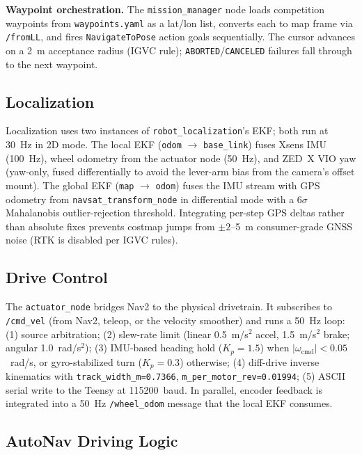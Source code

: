 \documentclass[12pt, letterpaper]{article}
\begin{document}
\textbf{Waypoint orchestration.} The \texttt{mission\_manager} node loads competition
waypoints from \texttt{waypoints.yaml} as a lat/lon list, converts each to map frame via
\texttt{/fromLL}, and fires \texttt{NavigateToPose} action goals sequentially. The
cursor advances on a 2~m acceptance radius (IGVC rule); \texttt{ABORTED}/\texttt{CANCELED}
failures fall through to the next waypoint.

\subsection{Localization}

Localization uses two instances of \texttt{robot\_localization}'s EKF; both run at
30~Hz in 2D mode. The local EKF (\texttt{odom} $\to$ \texttt{base\_link}) fuses Xsens
IMU (100~Hz), wheel odometry from the actuator node (50~Hz), and ZED~X VIO yaw
(yaw-only, fused differentially to avoid the lever-arm bias from the camera's offset
mount). The global EKF (\texttt{map} $\to$ \texttt{odom}) fuses the IMU stream with GPS
odometry from \texttt{navsat\_transform\_node} in differential mode with a 6$\sigma$
Mahalanobis outlier-rejection threshold. Integrating per-step GPS deltas rather than
absolute fixes prevents costmap jumps from $\pm 2$--5~m consumer-grade GNSS noise (RTK
is disabled per IGVC rules).

\subsection{Drive Control}
\label{sec:control}

The \texttt{actuator\_node} bridges Nav2 to the physical drivetrain. It subscribes to
\texttt{/cmd\_vel} (from Nav2, teleop, or the velocity smoother) and runs a 50~Hz loop:
(1) source arbitration; (2) slew-rate limit (linear 0.5~m/s$^2$ accel, 1.5~m/s$^2$
brake; angular 1.0~rad/s$^2$); (3) IMU-based heading hold ($K_p=1.5$) when
$|\omega_{\text{cmd}}|<0.05$~rad/s, or gyro-stabilized turn ($K_p=0.3$) otherwise;
(4) diff-drive inverse kinematics with \texttt{track\_width\_m=0.7366}, \texttt{m\_per\_motor\_rev=0.01994};
(5) ASCII serial write to the Teensy at 115200~baud. In parallel, encoder feedback is
integrated into a 50~Hz \texttt{/wheel\_odom} message that the local EKF consumes.

\subsection{AutoNav Driving Logic}
\end{document}
